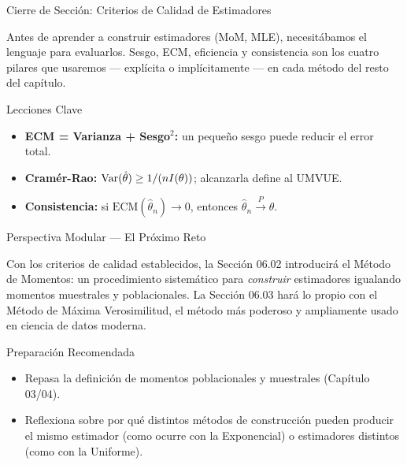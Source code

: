 \documentclass[10pt, aspectratio=169]{beamer}
\begin{document}
\begin{frame}{Cierre de Sección: Criterios de Calidad de Estimadores}
  \begin{reflexion}
    Antes de aprender a construir estimadores (MoM, MLE), necesitábamos el lenguaje para evaluarlos. Sesgo, ECM, eficiencia y consistencia son los cuatro pilares que usaremos --- explícita o implícitamente --- en cada método del resto del capítulo.
  \end{reflexion}

  \vspace{0.2cm}
  \pause
  \begin{block}{Lecciones Clave}
    \begin{itemize}\itemsep=0.08cm
      \item \textbf{ECM = Varianza + Sesgo$^2$:} un pequeño sesgo puede reducir el error total.
      \item \textbf{Cramér-Rao:} $\operatorname{Var}(\hat\theta) \ge 1/(nI(\theta))$; alcanzarla define al UMVUE.
      \item \textbf{Consistencia:} si $\text{ECM}(\hat\theta_n)\to 0$, entonces $\hat\theta_n \xrightarrow{P} \theta$.
    \end{itemize}
  \end{block}
\end{frame}

\begin{frame}{Perspectiva Modular --- El Próximo Reto}
  \scriptsize
  \begin{retoclase}
    Con los criterios de calidad establecidos, la Sección 06.02 introducirá el Método de Momentos: un procedimiento sistemático para \emph{construir} estimadores igualando momentos muestrales y poblacionales. La Sección 06.03 hará lo propio con el Método de Máxima Verosimilitud, el método más poderoso y ampliamente usado en ciencia de datos moderna.
  \end{retoclase}

  \vspace{0.08cm}
  \pause
  \begin{alertblock}{Preparación Recomendada}
    \begin{itemize}\itemsep=0.06cm
      \item Repasa la definición de momentos poblacionales y muestrales (Capítulo 03/04).
      \item Reflexiona sobre por qué distintos métodos de construcción pueden producir el mismo estimador (como ocurre con la Exponencial) o estimadores distintos (como con la Uniforme).
    \end{itemize}
  \end{alertblock}
\end{frame}
\end{document}
